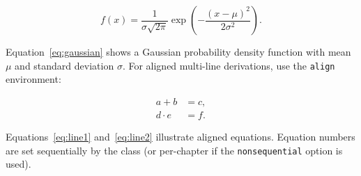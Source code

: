 \begin{equation}
  \label{eq:gaussian}
  f(x) = \frac{1}{\sigma\sqrt{2\pi}} \exp\!\left(-\frac{(x-\mu)^2}{2\sigma^2}\right).
\end{equation}

Equation~\eqref{eq:gaussian} shows a Gaussian probability density
function with mean $\mu$ and standard deviation $\sigma$.
For aligned multi-line derivations, use the \texttt{align} environment:

\begin{align}
  a + b  &= c, \label{eq:line1} \\
  d \cdot e &= f. \label{eq:line2}
\end{align}

Equations~\eqref{eq:line1} and~\eqref{eq:line2} illustrate aligned
equations.
Equation numbers are set sequentially by the class (or per-chapter
if the \texttt{nonsequential} option is used).

